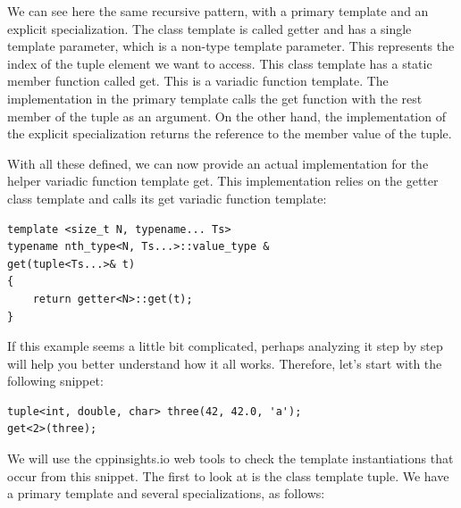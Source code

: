 We can see here the same recursive pattern, with a primary template and an explicit specialization. The class template is called getter and has a single template parameter, which is a non-type template parameter. This represents the index of the tuple element we want to access. This class template has a static member function called get. This is a variadic function template. The implementation in the primary template calls the get function with the rest member of the tuple as an argument. On the other hand, the implementation of the explicit specialization returns the reference to the member value of the tuple.

With all these defined, we can now provide an actual implementation for the helper variadic function template get. This implementation relies on the getter class template and calls its get variadic function template:

\begin{lstlisting}[style=styleCXX]
template <size_t N, typename... Ts>
typename nth_type<N, Ts...>::value_type &
get(tuple<Ts...>& t)
{
	return getter<N>::get(t);
}
\end{lstlisting}

If this example seems a little bit complicated, perhaps analyzing it step by step will help you better understand how it all works. Therefore, let's start with the following snippet:

\begin{lstlisting}[style=styleCXX]
tuple<int, double, char> three(42, 42.0, 'a');
get<2>(three);
\end{lstlisting}

We will use the cppinsights.io web tools to check the template instantiations that occur from this snippet. The first to look at is the class template tuple. We have a primary template and several specializations, as follows:

